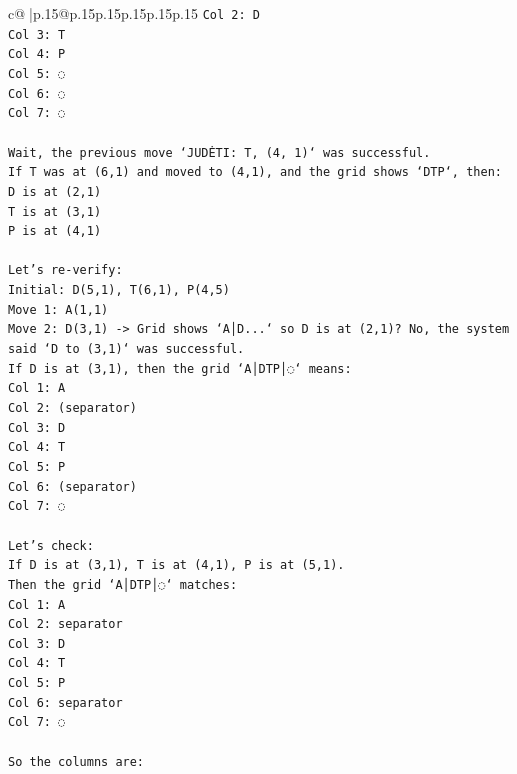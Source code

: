 \documentclass{article}
\begin{document}
{\begin{supertabular}{c@{$\;$}|p{.15\linewidth}@{}p{.15\linewidth}p{.15\linewidth}p{.15\linewidth}p{.15\linewidth}p{.15\linewidth}}
{{{\texttt{Col 2: D} \\
\texttt{Col 3: T} \\
\texttt{Col 4: P} \\
\texttt{Col 5: ◌} \\
\texttt{Col 6: ◌} \\
\texttt{Col 7: ◌} \\
\\ 
\texttt{Wait, the previous move `JUDĖTI: T, (4, 1)` was successful.} \\
\texttt{If T was at (6,1) and moved to (4,1), and the grid shows `DTP`, then:} \\
\texttt{D is at (2,1)} \\
\texttt{T is at (3,1)} \\
\texttt{P is at (4,1)} \\
\\ 
\texttt{Let's re{-}verify:} \\
\texttt{Initial: D(5,1), T(6,1), P(4,5)} \\
\texttt{Move 1: A(1,1)} \\
\texttt{Move 2: D(3,1) {-}> Grid shows `A│D...` so D is at (2,1)? No, the system said `D to (3,1)` was successful.} \\
\texttt{If D is at (3,1), then the grid `A│DTP│◌` means:} \\
\texttt{Col 1: A} \\
\texttt{Col 2: (separator)} \\
\texttt{Col 3: D} \\
\texttt{Col 4: T} \\
\texttt{Col 5: P} \\
\texttt{Col 6: (separator)} \\
\texttt{Col 7: ◌} \\
\\ 
\texttt{Let's check:} \\
\texttt{If D is at (3,1), T is at (4,1), P is at (5,1).} \\
\texttt{Then the grid `A│DTP│◌` matches:} \\
\texttt{Col 1: A} \\
\texttt{Col 2: separator} \\
\texttt{Col 3: D} \\
\texttt{Col 4: T} \\
\texttt{Col 5: P} \\
\texttt{Col 6: separator} \\
\texttt{Col 7: ◌} \\
\\ 
\texttt{So the columns are:} \\
}}}
\end{supertabular}}
\end{document}
